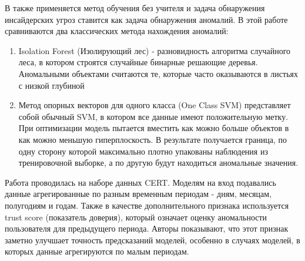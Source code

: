 В \cite{aldairiTrustAwareUnsupervised2019} также применяется метод обучения без учителя и задача обнаружения инсайдерских угроз ставится как задача обнаружения аномалий. В этой работе сравниваются два классических метода нахождения аномалий:\\
\begin{enumerate}
\item Isolation Forest (Изолирующий лес) - разновидность алгоритма случайного леса, в котором строятся случайные бинарные решающие деревья. Аномальными объектами считаются те, которые часто оказываются в листьях с низкой глубиной
\item Метод опорных векторов для одного класса (One Class SVM) представляет собой обычный SVM, в котором все данные имеют положительную метку. При оптимизации модель пытается вместить как можно больше объектов в как можно меньшую гиперплоскость. В результате получается граница, по одну сторону которой максимально плотно упакованы наблюдения из тренировочной выборке, а по другую будут находиться аномальные значения.\\
\end{enumerate}
Работа проводилась на наборе данных CERT. Моделям на вход подавались данные агрегированные по разным временным периодам - дням, месяцам, полугодиям и годам. Также в качестве дополнительного признака используется trust score (показатель доверия), который означает оценку аномальности пользователя для предыдущего периода. Авторы показывают, что этот признак заметно улучшает точность предсказаний моделей, особенно в случаях моделей, в которых данные агрегируются по малым периодам.\\

